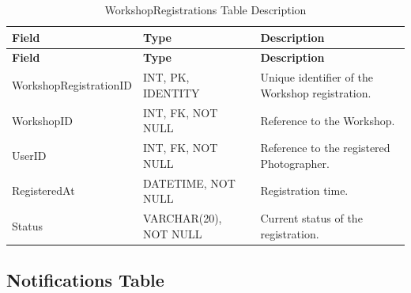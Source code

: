 \begin{longtable}{
		|>{\raggedright\arraybackslash}p{3.2cm}|
		>{\raggedright\arraybackslash}p{4.2cm}|
		>{\raggedright\arraybackslash}p{5.0cm}|
	}
	\caption{WorkshopRegistrations Table Description}
	\label{tab:workshop-registrations}\\
	\hline
	\textbf{Field} & \textbf{Type} & \textbf{Description} \\ \hline
	\endfirsthead
	\hline
	\textbf{Field} & \textbf{Type} & \textbf{Description} \\ \hline
	\endhead
	
	WorkshopRegistrationID & INT, PK, IDENTITY &
	Unique identifier of the Workshop registration. \\ \hline
	
	WorkshopID & INT, FK, NOT NULL &
	Reference to the Workshop. \\ \hline
	
	UserID & INT, FK, NOT NULL &
	Reference to the registered Photographer. \\ \hline
	
	RegisteredAt & DATETIME, NOT NULL &
	Registration time. \\ \hline
	
	Status & VARCHAR(20), NOT NULL &
	Current status of the registration. \\ \hline
	
\end{longtable}


\subsection{Notifications Table}

